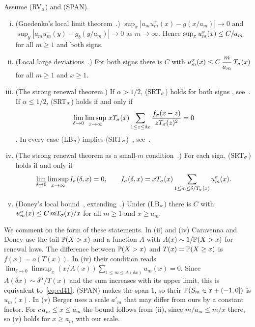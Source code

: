 \begin{lemma}\label{lem:cd}
Assume (RV$_\alpha$) and (SPAN).
\begin{enumerate}[(i)]
\item (Gnedenko's local limit theorem~\cite[Theorem~4.2.1]{ibragimovlinnik1971}.)
$\sup_x|a_mu^\plus_m(x)-g(x/a_m)|\to0$ and $\sup_y|a_mu^\minus_m(y)-g_b(y/a_m)|\to0$ as
$m\to\infty$. Hence $\sup_xu^\sigma_m(x)\le C/a_m$ for all $m\ge1$ and both signs.
\item (Local large deviations~\cite[Theorem~1.1, Eq.~(1.6)]{caravennadoney2019}.)
For both signs there is $C$ with $u^\sigma_m(x)\le C\,\dfrac m{a_m}\,T_\sigma(x)$ for all
$m\ge1$ and $x\ge1$.
\item (The strong renewal theorem.) If $\alpha>1/2$, (SRT$_\sigma$) holds for both signs
\cite{garsialamperti1963,erickson1970}, see~\cite[Theorem~1.4]{caravennadoney2019}.
If $\alpha\le1/2$, (SRT$_\sigma$) holds if and only if
\[
 \lim_{\delta\to0}\limsup_{x\to\infty}\,xT_\sigma(x)\sum_{1\le z\le\delta x}
 \frac{f_\sigma(x-z)}{zT_\sigma(z)^2}=0
\]
\cite[Theorem~1.4]{caravennadoney2019}. In every case (LB$_\sigma$) implies
(SRT$_\sigma$)~\cite{doney1997}, see~\cite[Eq.~(1.15)]{caravennadoney2019}.
\item (The strong renewal theorem as a small-$m$ condition~\cite[Section~4.1,
Eq.~(4.1)]{caravennadoney2019}.) For each sign, (SRT$_\sigma$) holds if and only if
\begin{equation}\label{eq:cd41}
 \lim_{\delta\to0}\limsup_{x\to\infty}I_\sigma(\delta,x)=0,\qquad
 I_\sigma(\delta,x)=xT_\sigma(x)\sum_{1\le m\le\delta/T_\sigma(x)}u^\sigma_m(x).
\end{equation}
\item (Doney's local bound~\cite[Theorem~2.4]{berger2019ptrf}, extending~\cite[Theorem~A]{doney1997}.)
Under (LB$_\sigma$) there is $C$ with $u^\sigma_m(x)\le C\,mT_\sigma(x)/x$ for all $m\ge1$
and $x\ge a_m$.
\end{enumerate}
\end{lemma}

We comment on the form of these statements. In (ii) and (iv) Caravenna and Doney
use the tail $\mathbb{P}(X>x)$ and a function $A$ with $A(x)\sim1/\mathbb{P}(X>x)$ for renewal
laws. The difference between $\mathbb{P}(X>x)$ and $T(x)=\mathbb{P}(X\ge x)$ is
$f(x)=o(T(x))$. In (iv) their condition reads
$\lim_{\delta\to0}\limsup_x(x/A(x))\sum_{1\le m\le A(\delta x)}u_m(x)=0$. Since
$A(\delta x)\sim\delta^\alpha/T(x)$ and the sum increases with its upper limit, this
is equivalent to~\eqref{eq:cd41}. (SPAN) makes the span $1$, so their
$\mathbb{P}(S_m\in x+(-1,0])$ is $u_m(x)$. In (v) Berger uses a scale $a'_m$ that may differ
from ours by a constant factor. For $c\,a_m\le x\le a_m$ the bound follows from (ii),
since $m/a_m\le m/x$ there, so (v) holds for $x\ge a_m$ with our scale.

